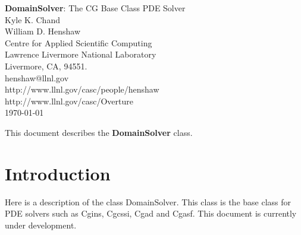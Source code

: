 \documentclass[11pt]{article}
\begin{document}


\def\comma  {~~~,~~}
\newcommand{\uvd}{\mathbf{U}}
\def\ud     {{    U}}
\def\pd     {{    P}}
\def\calo{{\cal O}}

\newcommand{\mbar}{\bar{m}}
\newcommand{\Rbar}{\bar{R}}
\newcommand{\Ru}{R_u}         %
\newcommand{\Div}{\grad\cdot}
\newcommand{\tauv}{\boldsymbol{\tau}}
\newcommand{\thetav}{\boldsymbol{\theta}}

\newcommand{\Omegav}{\boldsymbol{\Omega}}
\newcommand{\omegav}{\boldsymbol{\omega}}
\newcommand{\cm}{{\rm cm}}

\newcommand{\sumi}{\sum_{i=1}^n}
\newcommand{\dt}{{\Delta t}}

\def\ff {\tt} %

\vspace{5\baselineskip}
\begin{flushleft}
{\Large
{\bf DomainSolver}: The CG Base Class PDE Solver \\
}
\vspace{2\baselineskip}
Kyle K. Chand  \\
William D. Henshaw  \\
Centre for Applied Scientific Computing  \\
Lawrence Livermore National Laboratory      \\
Livermore, CA, 94551.  \\
henshaw@llnl.gov \\
http://www.llnl.gov/casc/people/henshaw \\
http://www.llnl.gov/casc/Overture\\
\vspace{\baselineskip}
\today\\
\vspace{\baselineskip}

\vspace{4\baselineskip}


This document describes the {\bf DomainSolver} class.
\end{flushleft}

\clearpage
\tableofcontents

\vfill\eject


\section{Introduction}

Here is a description of the class DomainSolver. This class is the base class for PDE solvers such 
as Cgins, Cgcssi, Cgad and Cgasf. This document is currently under development. 






\vfill\eject




\printindex
\end{document}
